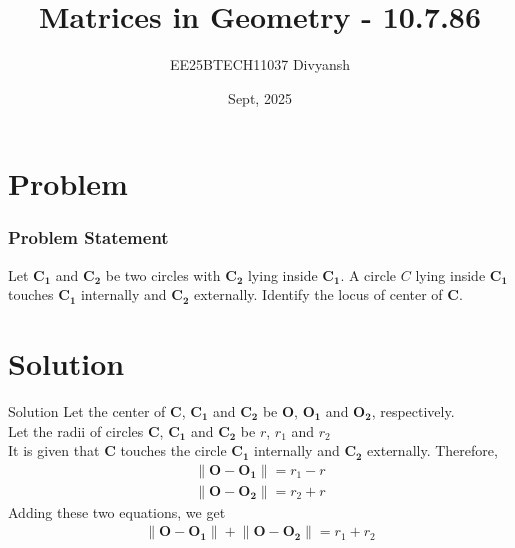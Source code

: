 \documentclass{beamer}
\title{Matrices in Geometry - 10.7.86}
\author{EE25BTECH11037  Divyansh}
\date{Sept, 2025}
\let\vec\mathbf
\theoremstyle{remark}
\providecommand{\norm}[1]{\left\lVert#1\right\rVert}
\begin{document}
\maketitle


\section{Problem}
\begin{frame}
\frametitle{Problem Statement}
Let $\vec{C_1}$ and $\vec{C_2}$ be two circles with $\vec{C_2}$ lying inside $\vec{C_1}$. A circle $C$ lying inside $\vec{C_1}$ touches $\vec{C_1}$ internally and $\vec{C_2}$ externally. Identify the locus of center of $\vec{C}$.
\end{frame}

\section{Solution}
\begin{frame}{Solution}
Let the center of $\vec{C}$, $\vec{C_1}$ and $\vec{C_2}$ be $\vec{O}$, $\vec{O_1}$ and $\vec{O_2}$, respectively.\\
Let the radii of circles $\vec{C}$, $\vec{C_1}$ and $\vec{C_2}$ be $r$, $r_1$ and $r_2$ \\
It is given that $\vec{C}$ touches the circle $\vec{C_1}$ internally and $\vec{C_2}$ externally. Therefore, 
\begin{align}
    \norm{\vec{O} - \vec{O_1}} = r_1 - r\\
    \norm{\vec{O} - \vec{O_2}} = r_2 + r
\end{align}
Adding these two equations, we get 
\begin{align}
    \norm{\vec{O} - \vec{O_1}} + \norm{\vec{O} - \vec{O_2}} = r_1 + r_2
\end{align}
\end{frame}
\end{document}
